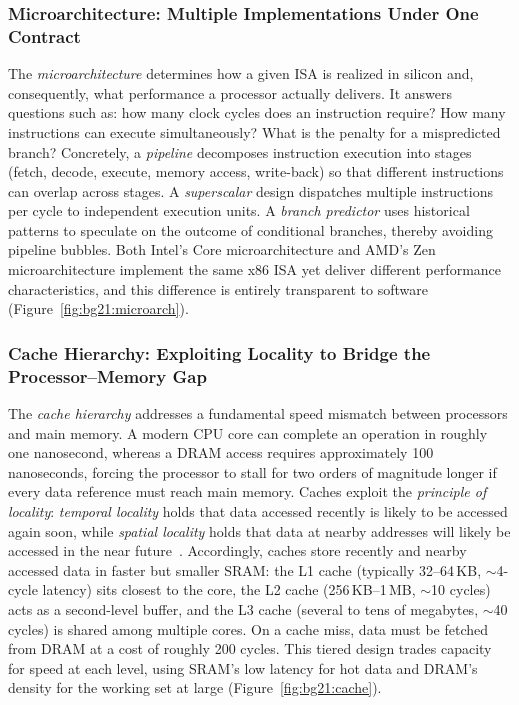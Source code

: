 \subsubsection{Microarchitecture: Multiple Implementations Under One Contract}

The \textit{microarchitecture} determines how a given ISA is realized in silicon and, consequently, what performance a processor actually delivers.
It answers questions such as: how many clock cycles does an instruction require? How many instructions can execute simultaneously? What is the penalty for a mispredicted branch?
Concretely, a \emph{pipeline} decomposes instruction execution into stages (fetch, decode, execute, memory access, write-back) so that different instructions can overlap across stages.
A \emph{superscalar} design dispatches multiple instructions per cycle to independent execution units.
A \emph{branch predictor} uses historical patterns to speculate on the outcome of conditional branches, thereby avoiding pipeline bubbles.
Both Intel's Core microarchitecture and AMD's Zen microarchitecture implement the same x86 ISA yet deliver different performance characteristics, and this difference is entirely transparent to software (Figure~\ref{fig:bg21:microarch}).


\subsubsection{Cache Hierarchy: Exploiting Locality to Bridge the Processor--Memory Gap}

The \textit{cache hierarchy} addresses a fundamental speed mismatch between processors and main memory.
A modern CPU core can complete an operation in roughly one nanosecond, whereas a DRAM access requires approximately 100 nanoseconds, forcing the processor to stall for two orders of magnitude longer if every data reference must reach main memory.
Caches exploit the \emph{principle of locality}: \emph{temporal locality} holds that data accessed recently is likely to be accessed again soon, while \emph{spatial locality} holds that data at nearby addresses will likely be accessed in the near future~\cite{drepper2007memory}.
Accordingly, caches store recently and nearby accessed data in faster but smaller SRAM: the L1 cache (typically 32--64\,KB, $\sim$4-cycle latency) sits closest to the core, the L2 cache (256\,KB--1\,MB, $\sim$10 cycles) acts as a second-level buffer, and the L3 cache (several to tens of megabytes, $\sim$40 cycles) is shared among multiple cores.
On a cache miss, data must be fetched from DRAM at a cost of roughly 200 cycles.
This tiered design trades capacity for speed at each level, using SRAM's low latency for hot data and DRAM's density for the working set at large (Figure~\ref{fig:bg21:cache}).


